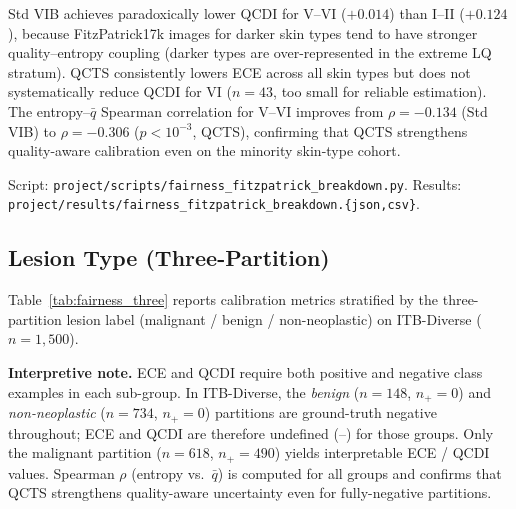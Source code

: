 \documentclass{bmvc2k}
\newcommand{\qbar}{\bar{q}}
\begin{document}
Std VIB achieves paradoxically lower QCDI for V--VI ($+0.014$) than I--II ($+0.124$), because FitzPatrick17k images for darker skin types tend to have stronger quality--entropy coupling (darker types are over-represented in the extreme LQ stratum). QCTS consistently lowers ECE across all skin types but does not systematically reduce QCDI for VI ($n{=}43$, too small for reliable estimation). The entropy--$\qbar$ Spearman correlation for V--VI improves from $\rho{=}{-}0.134$ (Std VIB) to $\rho{=}{-}0.306$ ($p{<}10^{-3}$, QCTS), confirming that QCTS strengthens quality-aware calibration even on the minority skin-type cohort.

Script: \texttt{project/scripts/fairness\_fitzpatrick\_breakdown.py}.
Results: \texttt{project/results/fairness\_fitzpatrick\_breakdown.\{json,csv\}}.


\subsection{Lesion Type (Three-Partition)}
\label{app:fairness_three}

Table~\ref{tab:fairness_three} reports calibration metrics stratified by the
three-partition lesion label (malignant / benign / non-neoplastic) on
ITB-Diverse ($n{=}1{,}500$).

\textbf{Interpretive note.}
ECE and QCDI require both positive and negative class examples in each
sub-group. In ITB-Diverse, the \emph{benign} ($n{=}148$, $n_+{=}0$) and
\emph{non-neoplastic} ($n{=}734$, $n_+{=}0$) partitions are ground-truth
negative throughout; ECE and QCDI are therefore undefined (--) for those
groups. Only the malignant partition ($n{=}618$, $n_+{=}490$) yields
interpretable ECE / QCDI values. Spearman $\rho$ (entropy vs.\ $\qbar$) is
computed for all groups and confirms that QCTS strengthens quality-aware
uncertainty even for fully-negative partitions.
\end{document}

